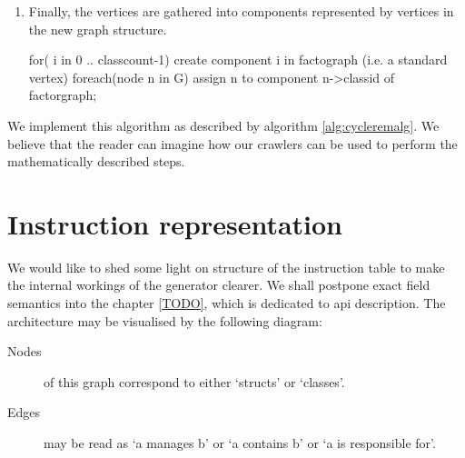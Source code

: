 \begin{enumerate}
  \item Finally, the vertices are gathered into components represented by vertices in the new graph structure.
\begin{code}
for( i in 0 .. classcount-1)
  create component i in factograph (i.e. a standard vertex)
foreach(node n in G)
  assign n to component n->classid of factorgraph;
\end{code}
\end{enumerate}



We implement this algorithm as described by algorithm \ref{alg:cycleremalg}. We believe that the reader can imagine how our crawlers can be used to perform the mathematically described steps.

\section{Instruction representation}

\label{sec:instab}

We would like to shed some light on structure of the instruction table to make the internal workings of the generator clearer. We shall postpone exact field semantics into the chapter \ref{TODO}, which is dedicated to api description. The architecture may be visualised by the following diagram:


\begin{description}
  \item [Nodes] of this graph correspond to either `structs' or `classes'.
  \item [Edges] may be read as `a manages b' or `a contains b' or `a is responsible for'.
\end{description}

